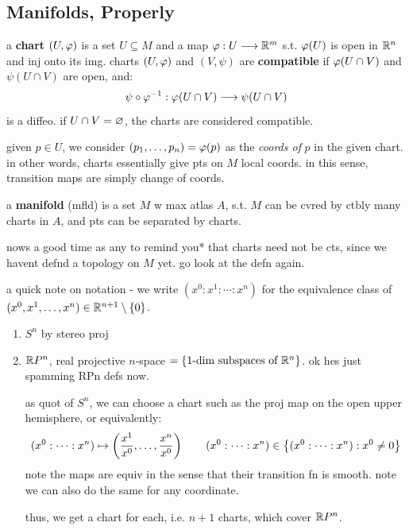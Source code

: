 \subsection{Manifolds, Properly}

\begin{defn}
	a \textbf{chart} $(U,\varphi)$ is a set $U\subseteq M$ and a map $\varphi:U\longrightarrow\mathbb{R}^{m}$
	s.t. $\varphi(U)$ is open in $\mathbb{R}^{n}$ and inj onto its img.
	charts $(U,\varphi)$ and $(V,\psi)$ are \textbf{compatible} if
	$\varphi(U\cap V)$ and $\psi(U\cap V)$ are open, and:
	\begin{equation*}
		\psi\circ\varphi^{-1}:\varphi(U\cap V)\longrightarrow\psi(U\cap V)
	\end{equation*}
	is a diffeo. if $U\cap V=\varnothing$, the charts are considered compatible.
\end{defn}

given $p\in U$, we consider $(p_{1},\dots,p_{n})=\varphi(p)$ as the \textit{coords of} $p$
in the given chart. in other words, charts essentially give pts on $M$ local coords.
in this sense, transition maps are simply change of coords.

\begin{defn}
    a \textbf{manifold} (mfld) is a set $M$ w max atlas $A$, s.t.
	$M$ can be cvred by ctbly many charts in $A$, and pts can be
	separated by charts.
\end{defn}
nows a good time as any to remind you* that charts need not be cts,
since we havent defnd a topology on $M$ yet.
go look at the defn again.

a quick note on notation - we write $(x^{0}:x^{1}:\cdots:x^{n})$
for the equivalence class of $(x^{0},x^{1},\dots,x^{n})\in\mathbb{R}^{n+1}\setminus\left\{{0}\right\}$.

\newpage
\begin{xmp}[source=Primary Source Material]
	\vspace{-0.3in}
    \begin{enumerate}
		\item $S^{n}$ by stereo proj
		\item $\mathbb{R} P^{n}$, real projective $n$-space
			$= \left\{{\textrm{1-dim subspaces of }\mathbb{R}^{n}}\right\}$.
			ok hes just spamming RPn defs now.

			as quot of $S^{n}$, we can choose a chart such as the proj map
			on the open upper hemisphere, or equivalently:
			\begin{equation*}
				(x^{0}:\cdots:x^{n}) \mapsto
				\left(\frac{x^{1}}{x^{0}},\dots,\frac{x^{n}}{x^{0}}\right)
				\qquad
				(x^{0}:\cdots:x^{n})\in\left\{{(x^{0}:\cdots:x^{n}):x^{0}\neq0}\right\}
			\end{equation*}
			note the maps are equiv in the sense that their transition fn is
			smooth. note we can also do the same for any coordinate.

			thus, we get a chart for each, i.e. $n+1$ charts, which cover
			$\mathbb{R} P^{n}$.
    \end{enumerate}
\end{xmp}


